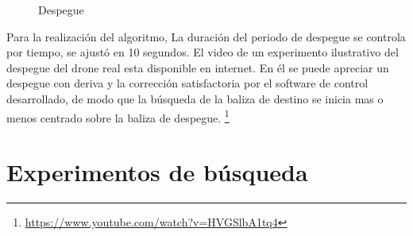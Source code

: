 \begin{figure}[H]
 \centering
 \caption{Despegue}
 \label{f:Test Despegue}
\end{figure}

Para la realizaci\'on del algoritmo, La duraci\'on del periodo de despegue se controla por tiempo, se ajust\'o en 10 segundos. 
El video de un experimento ilustrativo del despegue del drone real esta disponible en internet. En \'el se puede apreciar un despegue con deriva y la correcci\'on satisfactoria por el software de control desarrollado, de modo que la b\'usqueda de la baliza de destino se inicia mas o menos centrado sobre la baliza de despegue. 
\footnote{\url{https://www.youtube.com/watch?v=HVGSlbA1tq4}}

\section{Experimentos de b\'usqueda }

